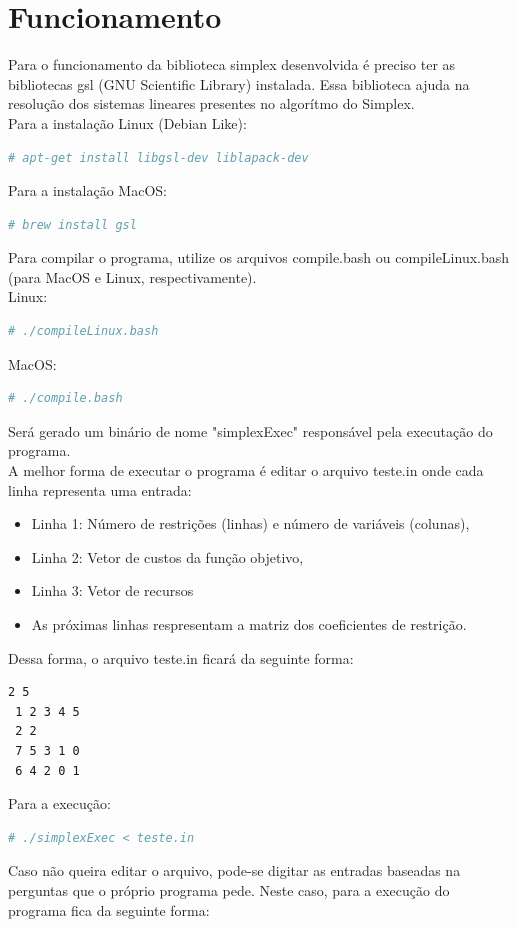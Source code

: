 \documentclass[a4paper]{article}
\begin{document}
\section{Funcionamento}
Para o funcionamento da biblioteca simplex desenvolvida \'e preciso ter as bibliotecas gsl (GNU Scientific Library) instalada. Essa biblioteca ajuda na resolu\c{c}\~ao dos sistemas lineares presentes no algor\'itmo do Simplex.\\
Para a instala\c{c}\~ao Linux (Debian Like):
\begin{lstlisting}[language=bash]
  # apt-get install libgsl-dev liblapack-dev
\end{lstlisting}
Para a instala\c{c}\~ao MacOS:
\begin{lstlisting}[language=bash]
  # brew install gsl 
\end{lstlisting}
Para compilar o programa, utilize os arquivos compile.bash ou compileLinux.bash (para MacOS e Linux, respectivamente).
\\
Linux:
\begin{lstlisting}[language=bash]
  # ./compileLinux.bash 
\end{lstlisting}
MacOS:
\begin{lstlisting}[language=bash]
  # ./compile.bash 
\end{lstlisting}
Ser\'a gerado um bin\'ario de nome "simplexExec" respons\'avel pela executa\c{c}\~ao do programa.
\\
A melhor forma de executar o programa \'e editar o arquivo teste.in onde cada linha representa uma entrada:
\\
\begin{itemize}
\item Linha 1: N\'umero de restri\c{c}\~oes (linhas) e n\'umero de vari\'aveis (colunas),
\item Linha 2: Vetor de custos da fun\c{c}\~ao objetivo,
\item Linha 3: Vetor de recursos
\item As pr\'oximas linhas respresentam a matriz dos coeficientes de restri\c{c}\~ao.
\end{itemize}
Dessa forma, o arquivo teste.in ficar\'a da seguinte forma:
\begin{lstlisting}[language=bash]
 2 5
 1 2 3 4 5
 2 2
 7 5 3 1 0
 6 4 2 0 1
\end{lstlisting}
Para a execu\c{c}\~ao:
\begin{lstlisting}[language=bash]
  # ./simplexExec < teste.in
\end{lstlisting}
Caso n\~ao queira editar o arquivo, pode-se digitar as entradas baseadas na perguntas que o pr\'oprio programa pede. Neste caso, para a execu\c{c}\~ao do programa fica da seguinte forma:
\end{document}
